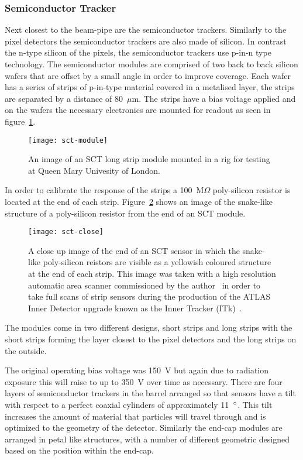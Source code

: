 \subsubsection{Semiconductor Tracker}

Next closest to the beam-pipe are the semiconductor trackers. Similarly to the pixel
detectors the semiconductor trackers are also made of silicon. In contrast the
n-type silicon of the pixels, the semiconductor trackers use p-in-n type
technology. The semiconductor modules are comprised of two back to back silicon
wafers that are offset by a small angle in order to improve coverage. Each wafer
has a series of strips of p-in-type material covered in a metalised layer, the
strips are separated by a distance of 80~$\mu$m. The strips have a bias voltage
applied and on the wafers the necessary electronics are mounted for readout as seen in
figure~\ref{fig:strip-module}.
\begin{figure}[h]
  \centering
  \texttt{[image: sct-module]}
  \caption[ATLAS long strip module]{An image of an SCT long strip module
    mounted in a rig for testing at Queen Mary Univesity of London.}
  \label{fig:strip-module}
\end{figure}
In order to calibrate the response of the strips a 100~M$\Omega$ poly-silicon
resistor is located at the end of each strip. Figure~\ref{fig:sct-close} shows an
image of the snake-like structure of a poly-silicon resistor from the end of an
SCT module.
\begin{figure}[h]
  \centering
  \texttt{[image: sct-close]}
  \caption[ATLAS strip close-up]{A close up image of the end of an SCT sensor in
    which the snake-like poly-silicon reistors are visible as a yellowish
    coloured structure at the end of each strip. This image was taken with a
    high resolution automatic area scanner commissioned by the
    author~\cite{itk-scanner} in order to take full scans of strip sensors
    during the production of the ATLAS Inner Detector upgrade known as the Inner
    Tracker (ITk)~\cite{itk-tdr, itk-strips-tdr}.}
  \label{fig:sct-close}
\end{figure}
The modules come in two different designs, short strips and long
strips with the short strips forming the layer closest to the pixel detectors
and the long strips on the outside.

The original operating bias voltage was 150~V but again due to radiation
exposure this will raise to up to 350~V over time as necessary. There are four
layers of semiconductor trackers in the barrel arranged so that sensors have a
tilt with respect to a perfect coaxial cylinders of approximately 11~$\degree$.
This tilt increases the amount of material that particles will travel through
and is optimized to the geometry of the detector. Similarly the end-cap modules
are arranged in petal like structures, with a number of different geometric
designed based on the position within the end-cap.

